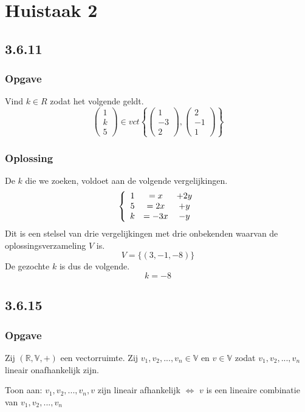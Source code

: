 \documentclass[lineaire_algebra_oplossingen.tex]{subfiles}
\begin{document}
\section{Huistaak 2}

\subsection{3.6.11}
\subsubsection*{Opgave}
Vind $k\in R$ zodat het volgende geldt.
\[
\begin{pmatrix}
1\\k\\5
\end{pmatrix}
\in 
vct
\left\lbrace
\begin{pmatrix}
1\\-3\\2
\end{pmatrix}
,
\begin{pmatrix}
2\\-1\\1
\end{pmatrix}
\right\rbrace
\]
\subsubsection*{Oplossing}
De $k$ die we zoeken, voldoet aan de volgende vergelijkingen.
\[
\left\lbrace
\begin{array}{c c c}
1 &= x   &+ 2y\\
5 &= 2x  &+ y\\
k &= -3x &- y\\
\end{array}
\right.
\]
Dit is een stelsel van drie vergelijkingen met drie onbekenden waarvan de oplossingsverzameling $V$ is.
\[
V = \{ (3,-1,-8) \}
\]
De gezochte $k$ is dus de volgende.
\[
k = -8
\]
\pagebreak
\subsection{3.6.15}
\subsubsection*{Opgave}
Zij $(\mathbb{R},\mathbb{V},+)$ een vectorruimte.
Zij $v_1,v_2,...,v_n \in \mathbb{V}$ en $v \in \mathbb{V}$ zodat $v_1,v_2,...,v_n$ lineair onafhankelijk zijn.

Toon aan:
$v_1,v_2,...,v_n, v$ zijn lineair afhankelijk $\Leftrightarrow$ $v$ is een lineaire combinatie van $v_1,v_2,...,v_n$
\end{document}
